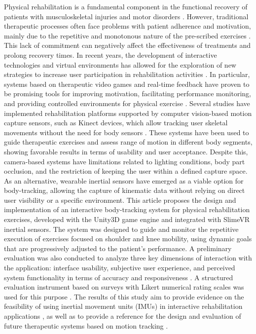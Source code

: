 \documentclass[a4paper,twoside]{article}
\begin{document}
\noindent Physical rehabilitation is a fundamental component in the functional recovery of patients with musculoskeletal injuries and motor disorders \cite{Kiani, 2026}. However, traditional therapeutic processes often face problems with patient adherence and motivation, mainly due to the repetitive and monotonous nature of the pre-scribed exercises \cite{Gu2023, Alenjareghi, 2026}. This lack of commitment can negatively affect the effectiveness of treatments and prolong recovery times. In recent years, the development of interactive technologies and virtual environments has allowed for the exploration of new strategies to increase user participation in rehabilitation activities \cite{Amin, 2025}. In particular, systems based on therapeutic video games and real-time feedback have proven to be promising tools for improving motivation, facilitating performance monitoring, and providing controlled environments for physical exercise \cite{Alam, 2025}.
Several studies have implemented rehabilitation platforms supported by computer vision-based motion capture sensors, such as Kinect devices, which allow tracking user skeletal movements without the need for body sensors \cite{Alenjareghi, 2026}. These systems have been used to guide therapeutic exercises and assess range of motion in different body segments, showing favorable results in terms of usability and user acceptance.
Despite this, camera-based systems have limitations related to lighting conditions, body part occlusion, and the restriction of keeping the user within a defined capture space. As an alternative, wearable inertial sensors have emerged as a viable option for body-tracking, allowing the capture of kinematic data without relying on direct user visibility or a specific environment.
This article proposes the design and implementation of an interactive body-tracking system for physical rehabilitation exercises, developed with the Unity3D game engine and integrated with SlimeVR inertial sensors. The system was designed to guide and monitor the repetitive execution of exercises focused on shoulder and knee mobility, using dynamic goals that are progressively adjusted to the patient's performance.
A preliminary evaluation was also conducted to analyze three key dimensions of interaction with the application: interface usability, subjective user experience, and perceived system functionality in terms of accuracy and responsiveness \cite{Qu, 2025}. A structured evaluation instrument based on surveys with Likert numerical rating scales was used for this purpose \cite{Juan, 2023}.
The results of this study aim to provide evidence on the feasibility of using inertial movement units (IMUs) in interactive rehabilitation applications \cite{Grossman, 2026}, as well as to provide a reference for the design and evaluation of future therapeutic systems based on motion tracking \cite{MousaviHondori, 2014}.
\end{document}
